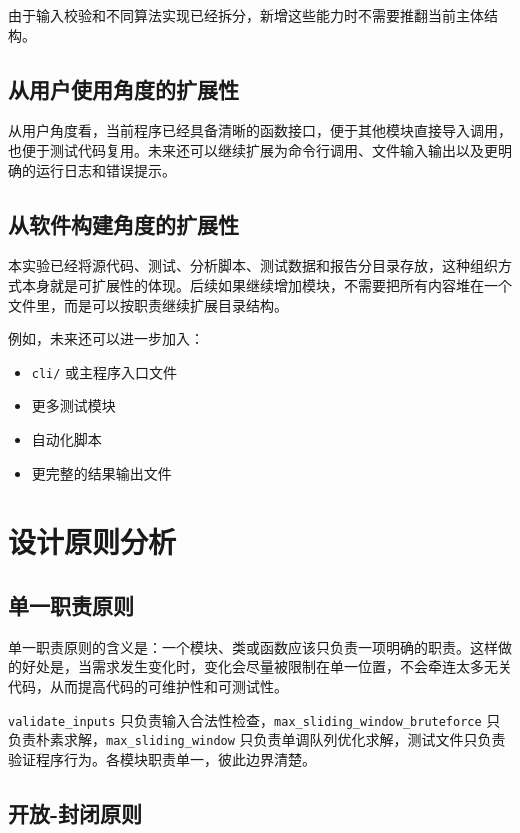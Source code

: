 \documentclass[a4paper,UTF8,fontset=none]{ctexart}
\begin{document}
由于输入校验和不同算法实现已经拆分，新增这些能力时不需要推翻当前主体结构。

\subsection{从用户使用角度的扩展性}

从用户角度看，当前程序已经具备清晰的函数接口，便于其他模块直接导入调用，也便于测试代码复用。未来还可以继续扩展为命令行调用、文件输入输出以及更明确的运行日志和错误提示。

\subsection{从软件构建角度的扩展性}

本实验已经将源代码、测试、分析脚本、测试数据和报告分目录存放，这种组织方式本身就是可扩展性的体现。后续如果继续增加模块，不需要把所有内容堆在一个文件里，而是可以按职责继续扩展目录结构。

例如，未来还可以进一步加入：

\begin{itemize}
    \item \texttt{cli/} 或主程序入口文件
    \item 更多测试模块
    \item 自动化脚本
    \item 更完整的结果输出文件
\end{itemize}

\section{设计原则分析}

\subsection{单一职责原则}

单一职责原则的含义是：一个模块、类或函数应该只负责一项明确的职责。这样做的好处是，当需求发生变化时，变化会尽量被限制在单一位置，不会牵连太多无关代码，从而提高代码的可维护性和可测试性。

\medskip

\texttt{validate\_inputs} 只负责输入合法性检查，\texttt{max\_sliding\_window\_bruteforce} 只负责朴素求解，\texttt{max\_sliding\_window} 只负责单调队列优化求解，测试文件只负责验证程序行为。各模块职责单一，彼此边界清楚。

\subsection{开放-封闭原则}
\end{document}
